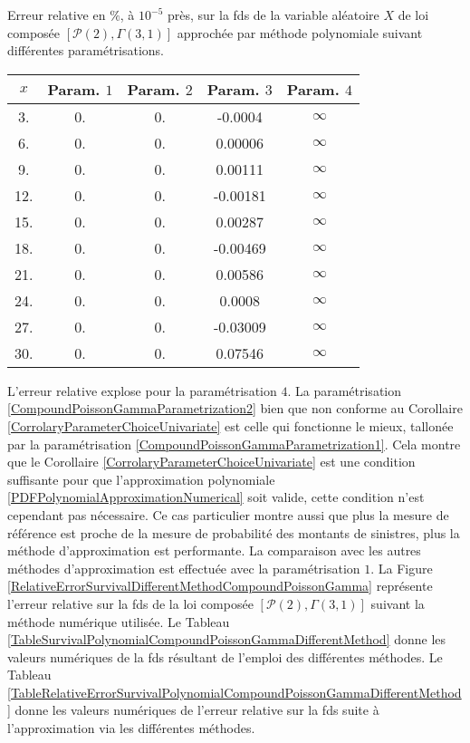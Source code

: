 \begin{tableth}
		\caption[Erreur relative ($\%$) sur la \gls{fds} d'une loi $\left(\mathcal{P}(2),\Gamma(3,1)\right)$ associée à la méthode d'approximation polynomiale]{Erreur relative en $\%$, à $10^{-5}$ près, sur la \gls{fds} de la variable aléatoire $X$ de loi composée $\left[\mathcal{P}(2),\Gamma(3,1)\right]$ approchée par méthode polynomiale suivant différentes paramétrisations.}
			\label{TableRelativeErrorSurvivalPolynomialCompoundPoissonGamma}
		\begin{tabular}{|c||c|c|c|c|}
\hline
$x$ & Param. $1$ & Param. $2$ & Param. $3$& Param. $4$ \\
\hline
\hline
3. & 0. & 0. & -0.0004 & $\infty$ \\
 6. & 0. & 0. & 0.00006 & $\infty$ \\
 9. & 0. & 0. & 0.00111 & $\infty$ \\
 12. & 0. & 0. & -0.00181 & $\infty$ \\
 15. & 0. & 0. & 0.00287 & $\infty$ \\
 18. & 0. & 0. & -0.00469 & $\infty$ \\
 21. & 0. & 0. & 0.00586 & $\infty$ \\
 24. & 0. & 0. & 0.0008 & $\infty$ \\
 27. & 0. & 0. & -0.03009 & $\infty$ \\
 30. & 0. & 0. & 0.07546 & $\infty$ \\
\hline
		\end{tabular}
	\end{tableth}

L\rq{}erreur relative explose pour la paramétrisation $4$. La paramétrisation \eqref{CompoundPoissonGammaParametrization2} bien que non conforme au Corollaire \ref{CorrolaryParameterChoiceUnivariate} est celle qui fonctionne le mieux, tallonée par la paramétrisation \eqref{CompoundPoissonGammaParametrization1}. Cela montre que le Corollaire \ref{CorrolaryParameterChoiceUnivariate} est une condition suffisante pour que l\rq{}approximation polynomiale \eqref{PDFPolynomialApproximationNumerical} soit valide, cette condition n\rq{}est cependant pas nécessaire. Ce cas particulier montre aussi que plus la mesure de référence est proche de la mesure de probabilité des montants de sinistres, plus la méthode d\rq{}approximation est performante. La comparaison avec les autres méthodes d\rq{}approximation est effectuée avec la paramétrisation $1$. La Figure \ref{RelativeErrorSurvivalDifferentMethodCompoundPoissonGamma} représente l\rq{}erreur relative sur la \gls{fds} de la loi composée $\left[\mathcal{P}(2),\Gamma(3,1)\right]$ suivant la méthode numérique utilisée. Le Tableau \ref{TableSurvivalPolynomialCompoundPoissonGammaDifferentMethod} donne les valeurs numériques de la \gls{fds} résultant de l\rq{}emploi des différentes méthodes. Le Tableau \ref{TableRelativeErrorSurvivalPolynomialCompoundPoissonGammaDifferentMethod} donne les valeurs numériques de l\rq{}erreur relative sur la \gls{fds} suite à l\rq{}approximation via les différentes méthodes.\\

